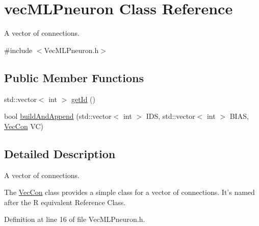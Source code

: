 \hypertarget{classvec_m_l_pneuron}{
\section{vecMLPneuron Class Reference}
\label{classvec_m_l_pneuron}
}


A vector of connections.  




{\ttfamily \#include $<$VecMLPneuron.h$>$}

\subsection*{Public Member Functions}
\begin{DoxyCompactItemize}
\item 
std::vector$<$ int $>$ \hyperlink{classvec_m_l_pneuron_a6ca2656e3ef5998104dd08b80597c7b8}{getId} ()
\item 
bool \hyperlink{classvec_m_l_pneuron_a2eeb007315309d793615f9c3a3ecd473}{buildAndAppend} (std::vector$<$ int $>$ IDS, std::vector$<$ int $>$ BIAS, \hyperlink{class_vec_con}{VecCon} VC)
\end{DoxyCompactItemize}


\subsection{Detailed Description}
A vector of connections. 

The \hyperlink{class_vec_con}{VecCon} class provides a simple class for a vector of connections. It's named after the R equivalent Reference Class. 

Definition at line 16 of file VecMLPneuron.h.



